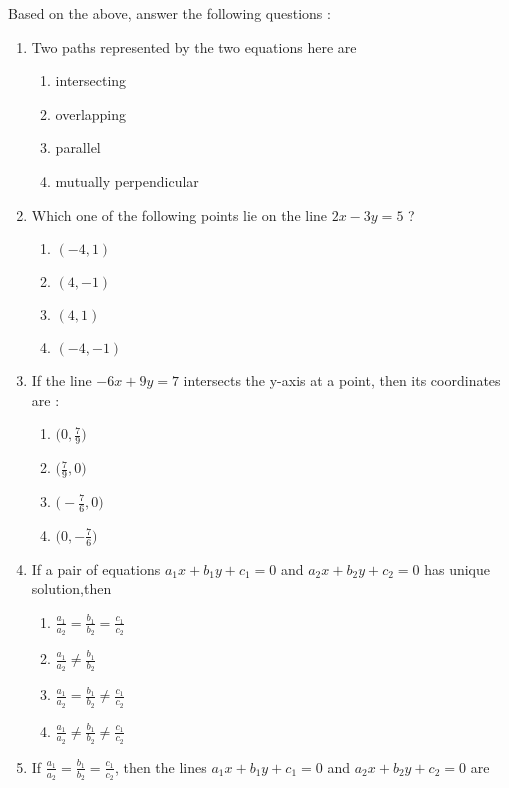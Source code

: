 \documentclass{article}
\begin{document}
\begin{enumerate}
Based on the above, answer the following questions :
 \begin{enumerate}[label=(\roman*)]
 \item Two paths represented by the two equations here are 
  \begin{enumerate}[label=(\Alph*)]
             \item intersecting
             \item overlapping
             \item parallel
             \item mutually perpendicular
    \end{enumerate}
\item Which one of the following points lie on the line $2x-3y=5$ ?
\begin{enumerate}[label=(\Alph*)]
             \item $\left( -4,1 \right)$
             \item $\left( 4,-1 \right)$
             \item $\left( 4,1 \right)$
             \item $\left( -4,-1 \right)$
    \end{enumerate}
\item If the line $-6x+9y=7$ intersects the y-axis at a point, then its coordinates are :
\begin{enumerate}[label=(\Alph*)]
             \item $\bigg(0,\frac{7}{9}\bigg)$
             \item $\bigg(\frac{7}{9},0\bigg)$
             \item $\bigg(-\frac{7}{6},0\bigg)$
             \item $\bigg(0,-\frac{7}{6}\bigg)$
\end{enumerate}
\item If a pair of equations $a_1x+b_1y+c_1=0$ and  $a_2x+b_2y+c_2=0$ has unique solution,then
\begin{enumerate}[label=(\Alph*)]
             \item $\frac{a_1}{a_2}=\frac{b_1}{b_2}=\frac{c_1}{c_2}$
             \item  $\frac{a_1}{a_2}\neq\frac{b_1}{b_2}$
             \item $\frac{a_1}{a_2}=\frac{b_1}{b_2}\neq\frac{c_1}{c_2}$
             \item $\frac{a_1}{a_2}\neq\frac{b_1}{b_2}\neq\frac{c_1}{c_2}$
\end{enumerate}
\item If $\frac{a_1}{a_2}=\frac{b_1}{b_2}=\frac{c_1}{c_2}$, then the lines $a_1x+b_1y+c_1=0$ and  $a_2x+b_2y+c_2=0$ are

\end{enumerate}
\end{enumerate}
\end{document}
